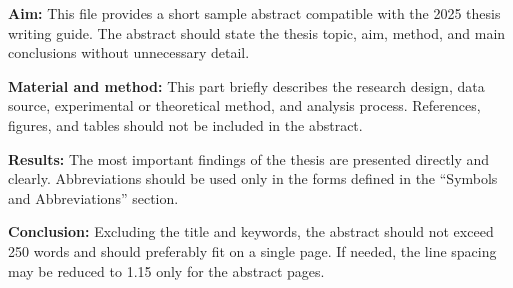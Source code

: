 \textbf{Aim:} This file provides a short sample abstract compatible with the 2025 thesis writing guide. The abstract should state the thesis topic, aim, method, and main conclusions without unnecessary detail.

\textbf{Material and method:} This part briefly describes the research design, data source, experimental or theoretical method, and analysis process. References, figures, and tables should not be included in the abstract.

\textbf{Results:} The most important findings of the thesis are presented directly and clearly. Abbreviations should be used only in the forms defined in the ``Symbols and Abbreviations'' section.

\textbf{Conclusion:} Excluding the title and keywords, the abstract should not exceed 250 words and should preferably fit on a single page. If needed, the line spacing may be reduced to 1.15 only for the abstract pages.
